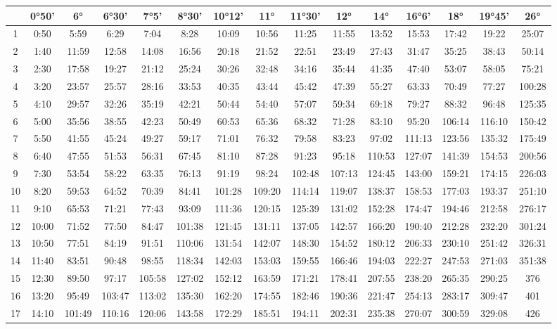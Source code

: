 \begin{footnotesize}\begin{tabular}{c | c | c | c | c | c | c | c | c | c | c | c | c | c | c}
		\space&0°50'&6°&6°30'&7°5'&8°30'&10°12'&11°&11°30'&12°&14°&16°6'&18°&19°45'&26°\\\hline
		1&0:50&5:59&6:29&7:04&8:28&10:09&10:56&11:25&11:55&13:52&15:53&17:42&19:22&25:07\\\hline
		2&1:40&11:59&12:58&14:08&16:56&20:18&21:52&22:51&23:49&27:43&31:47&35:25&38:43&50:14\\\hline
		3&2:30&17:58&19:27&21:12&25:24&30:26&32:48&34:16&35:44&41:35&47:40&53:07&58:05&75:21\\\hline
		4&3:20&23:57&25:57&28:16&33:53&40:35&43:44&45:42&47:39&55:27&63:33&70:49&77:27&100:28\\\hline
		5&4:10&29:57&32:26&35:19&42:21&50:44&54:40&57:07&59:34&69:18&79:27&88:32&96:48&125:35\\\hline
		6&5:00&35:56&38:55&42:23&50:49&60:53&65:36&68:32&71:28&83:10&95:20&106:14&116:10&150:42\\\hline
		7&5:50&41:55&45:24&49:27&59:17&71:01&76:32&79:58&83:23&97:02&111:13&123:56&135:32&175:49\\\hline
		8&6:40&47:55&51:53&56:31&67:45&81:10&87:28&91:23&95:18&110:53&127:07&141:39&154:53&200:56\\\hline
		9&7:30&53:54&58:22&63:35&76:13&91:19&98:24&102:48&107:13&124:45&143:00&159:21&174:15&226:03\\\hline
		10&8:20&59:53&64:52&70:39&84:41&101:28&109:20&114:14&119:07&138:37&158:53&177:03&193:37&251:10\\\hline
		11&9:10&65:53&71:21&77:43&93:09&111:36&120:15&125:39&131:02&152:28&174:47&194:46&212:58&276:17\\\hline
		12&10:00&71:52&77:50&84:47&101:38&121:45&131:11&137:05&142:57&166:20&190:40&212:28&232:20&301:24\\\hline
		13&10:50&77:51&84:19&91:51&110:06&131:54&142:07&148:30&154:52&180:12&206:33&230:10&251:42&326:31\\\hline
		14&11:40&83:51&90:48&98:55&118:34&142:03&153:03&159:55&166:46&194:03&222:27&247:53&271:03&351:38\\\hline
		15&12:30&89:50&97:17&105:58&127:02&152:12&163:59&171:21&178:41&207:55&238:20&265:35&290:25&376\\\hline
		16&13:20&95:49&103:47&113:02&135:30&162:20&174:55&182:46&190:36&221:47&254:13&283:17&309:47&401\\\hline
		17&14:10&101:49&110:16&120:06&143:58&172:29&185:51&194:11&202:31&235:38&270:07&300:59&329:08&426\\\hline

\end{tabular}
\end{footnotesize}

